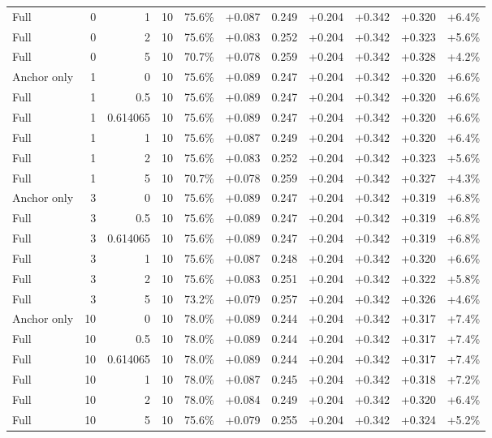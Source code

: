 \begin{table}[htbp]
\begin{tabular}{lrrrccccccc}
Full & 0 & 1 & 10 & 75.6\% & +0.087 & 0.249 & +0.204 & +0.342 & +0.320 & +6.4\% \\
Full & 0 & 2 & 10 & 75.6\% & +0.083 & 0.252 & +0.204 & +0.342 & +0.323 & +5.6\% \\
Full & 0 & 5 & 10 & 70.7\% & +0.078 & 0.259 & +0.204 & +0.342 & +0.328 & +4.2\% \\
Anchor only & 1 & 0 & 10 & 75.6\% & +0.089 & 0.247 & +0.204 & +0.342 & +0.320 & +6.6\% \\
Full & 1 & 0.5 & 10 & 75.6\% & +0.089 & 0.247 & +0.204 & +0.342 & +0.320 & +6.6\% \\
Full & 1 & 0.614065 & 10 & 75.6\% & +0.089 & 0.247 & +0.204 & +0.342 & +0.320 & +6.6\% \\
Full & 1 & 1 & 10 & 75.6\% & +0.087 & 0.249 & +0.204 & +0.342 & +0.320 & +6.4\% \\
Full & 1 & 2 & 10 & 75.6\% & +0.083 & 0.252 & +0.204 & +0.342 & +0.323 & +5.6\% \\
Full & 1 & 5 & 10 & 70.7\% & +0.078 & 0.259 & +0.204 & +0.342 & +0.327 & +4.3\% \\
Anchor only & 3 & 0 & 10 & 75.6\% & +0.089 & 0.247 & +0.204 & +0.342 & +0.319 & +6.8\% \\
Full & 3 & 0.5 & 10 & 75.6\% & +0.089 & 0.247 & +0.204 & +0.342 & +0.319 & +6.8\% \\
Full & 3 & 0.614065 & 10 & 75.6\% & +0.089 & 0.247 & +0.204 & +0.342 & +0.319 & +6.8\% \\
Full & 3 & 1 & 10 & 75.6\% & +0.087 & 0.248 & +0.204 & +0.342 & +0.320 & +6.6\% \\
Full & 3 & 2 & 10 & 75.6\% & +0.083 & 0.251 & +0.204 & +0.342 & +0.322 & +5.8\% \\
Full & 3 & 5 & 10 & 73.2\% & +0.079 & 0.257 & +0.204 & +0.342 & +0.326 & +4.6\% \\
Anchor only & 10 & 0 & 10 & 78.0\% & +0.089 & 0.244 & +0.204 & +0.342 & +0.317 & +7.4\% \\
Full & 10 & 0.5 & 10 & 78.0\% & +0.089 & 0.244 & +0.204 & +0.342 & +0.317 & +7.4\% \\
Full & 10 & 0.614065 & 10 & 78.0\% & +0.089 & 0.244 & +0.204 & +0.342 & +0.317 & +7.4\% \\
Full & 10 & 1 & 10 & 78.0\% & +0.087 & 0.245 & +0.204 & +0.342 & +0.318 & +7.2\% \\
Full & 10 & 2 & 10 & 78.0\% & +0.084 & 0.249 & +0.204 & +0.342 & +0.320 & +6.4\% \\
Full & 10 & 5 & 10 & 75.6\% & +0.079 & 0.255 & +0.204 & +0.342 & +0.324 & +5.2\% \\

\end{tabular}
\end{table}
